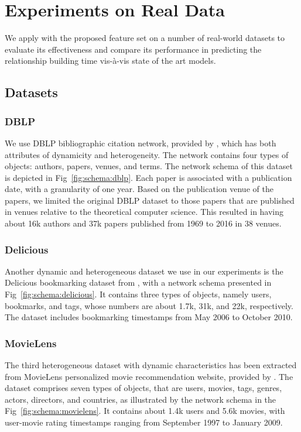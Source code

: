 \section{Experiments on Real Data}\label{sec:results}

We apply \npglm with the proposed feature set on a number of real-world datasets to evaluate its effectiveness and compare its performance in predicting the relationship building time vis-\`a-vis state of the art models. 

\subsection{Datasets}
\subsubsection{DBLP}
We use DBLP bibliographic citation network, provided by \cite{tang2008aminer}, which has both attributes of dynamicity and heterogeneity. The network contains four types of objects: authors, papers, venues, and terms. The network schema of this dataset is depicted in Fig~\ref{fig:schema:dblp}. Each paper is associated with a publication date, with a granularity of one year. Based on the publication venue of the papers, we limited the original DBLP dataset to those papers that are published in venues relative to the theoretical computer science. This resulted in having about 16k authors and 37k papers published from 1969 to 2016 in 38 venues. 

\subsubsection{Delicious}
Another dynamic and heterogeneous dataset we use in our experiments is the Delicious bookmarking dataset from \cite{Cantador:RecSys2011}, with a network schema presented in Fig~\ref{fig:schema:delicious}. It contains three types of objects, namely users, bookmarks, and tags, whose numbers are about 1.7k, 31k, and 22k, respectively. The dataset includes bookmarking timestamps from May 2006 to October 2010.

\subsubsection{MovieLens}
The third heterogeneous dataset with dynamic characteristics has been extracted from MovieLens personalized movie recommendation website, provided by \cite{harper2015}. The dataset comprises seven types of objects, that are users, movies, tags, genres, actors, directors, and countries, as illustrated by the network schema in the Fig~\ref{fig:schema:movielens}. It contains about 1.4k users and 5.6k movies, with user-movie rating timestamps ranging from September 1997 to January 2009.


